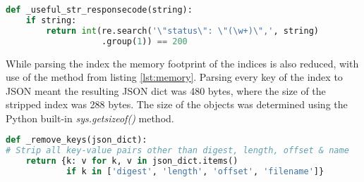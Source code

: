 \begin{lstlisting}[language=Python, caption=Regex solution]
def _useful_str_responsecode(string):
    if string:
        return int(re.search('\"status\": \"(\w+)\",', string)
                   .group(1)) == 200
\end{lstlisting}

While parsing the index the memory footprint of the indices is also reduced, with use of the method from listing \ref{lst:memory}. Parsing every key of the index to JSON meant the resulting JSON dict was 480 bytes, where the size of the stripped index was 288 bytes. The size of the objects was determined using the Python built-in \textit{sys.getsizeof()} method. 

\begin{lstlisting}[language=Python, caption=Reducing memory footprint, label={lst:memory}]
def _remove_keys(json_dict):
# Strip all key-value pairs other than digest, length, offset & name
    return {k: v for k, v in json_dict.items()
            if k in ['digest', 'length', 'offset', 'filename']}
\end{lstlisting}
